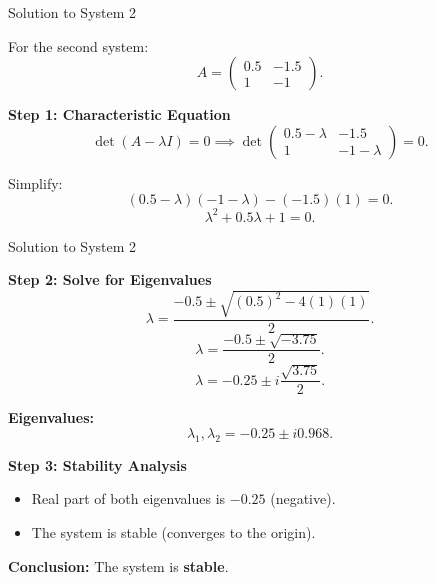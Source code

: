 \documentclass{beamer}
\begin{document}
\begin{frame}{Solution to System 2}

For the second system:
\[
A = \begin{pmatrix} 0.5 & -1.5 \\ 1 & -1 \end{pmatrix}.
\]

\textbf{Step 1: Characteristic Equation}
\[
\det(A - \lambda I) = 0 \implies 
\det \begin{pmatrix} 0.5 - \lambda & -1.5 \\ 1 & -1 - \lambda \end{pmatrix} = 0.
\]

Simplify:
\[
(0.5 - \lambda)(-1 - \lambda) - (-1.5)(1) = 0.
\]
\[
\lambda^2 + 0.5\lambda + 1 = 0.
\]

\end{frame}

\begin{frame}{Solution to System 2}

\textbf{Step 2: Solve for Eigenvalues}
\[
\lambda = \frac{-0.5 \pm \sqrt{(0.5)^2 - 4(1)(1)}}{2}.
\]
\[
\lambda = \frac{-0.5 \pm \sqrt{-3.75}}{2}.
\]
\[
\lambda = -0.25 \pm i\frac{\sqrt{3.75}}{2}.
\]

\textbf{Eigenvalues:}
\[
\lambda_1, \lambda_2 = -0.25 \pm i 0.968.
\]

\textbf{Step 3: Stability Analysis}
\begin{itemize}
    \item Real part of both eigenvalues is \( -0.25 \) (negative).
    \item The system is stable (converges to the origin).
\end{itemize}

\textbf{Conclusion:} The system is \textbf{stable}.

\end{frame}
\end{document}
